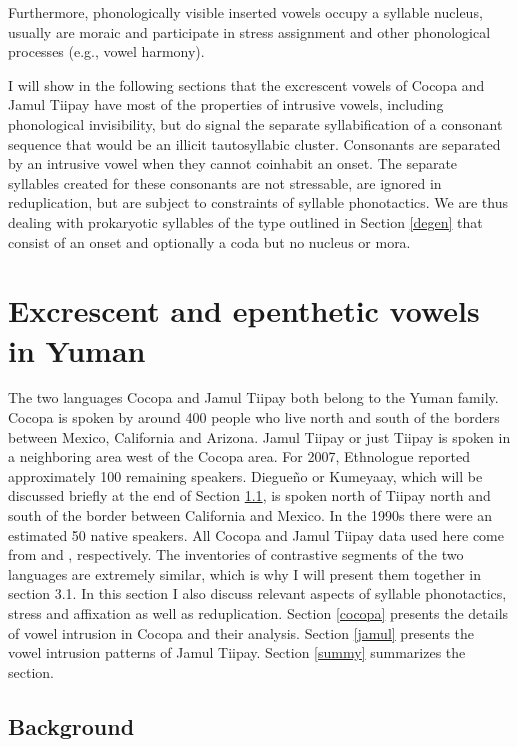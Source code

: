 \documentclass[output=paper,colorlinks,citecolor=brown]{langscibook}
\begin{document}
Furthermore, phonologically visible inserted vowels occupy a syllable nucleus, usually are moraic and participate in stress assignment and other phonological processes (e.g., vowel harmony). 

I will show in the following sections that the excrescent vowels of Cocopa and Jamul Tiipay have most of the properties of intrusive vowels, including phonological invisibility, but do signal the separate syllabification of a consonant sequence that would be an illicit tautosyllabic cluster. Consonants are separated by an intrusive vowel when they cannot coinhabit an onset. The separate syllables created for these consonants are not stressable, are ignored in reduplication, but are subject to constraints of syllable phonotactics. We are thus dealing with prokaryotic syllables of the type outlined in Section \ref{degen} that consist of an onset and optionally a coda but no nucleus or mora.

\section{Excrescent and epenthetic vowels in Yuman}\label{excre}

The two languages Cocopa and Jamul Tiipay both belong to the Yuman family. Cocopa is spoken by around 400 people who live north and south of the borders between Mexico, California and Arizona. Jamul Tiipay or just Tiipay is spoken in a neighboring area west of the Cocopa area. For 2007, Ethnologue reported approximately 100 remaining speakers. Diegueño or Kumeyaay, which will be discussed briefly at the end of Section \ref{back}, is spoken north of Tiipay north and south of the border between California and Mexico. In the 1990s there were an estimated 50 native speakers. All Cocopa and Jamul Tiipay data used here come from \citet{Crawford1966} and \citet{Miller2001}, respectively. The inventories of contrastive segments of the two languages are extremely similar, which is why I will present them together in section 3.1. In this section I also discuss relevant aspects of syllable phonotactics, stress and affixation as well as reduplication. Section \ref{cocopa} presents the details of vowel intrusion in Cocopa and their analysis. Section \ref{jamul} presents the vowel intrusion patterns of Jamul Tiipay. Section \ref{summy} summarizes the section.

\subsection{Background} \label{back}
\end{document}
